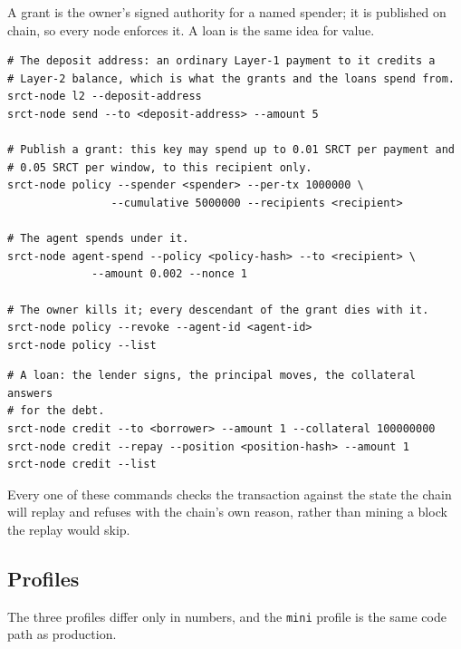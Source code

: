 \documentclass{article}
\begin{document}
A grant is the owner's signed authority for a named spender; it is published on
chain, so every node enforces it. A loan is the same idea for value.

\begin{verbatim}
# The deposit address: an ordinary Layer-1 payment to it credits a
# Layer-2 balance, which is what the grants and the loans spend from.
srct-node l2 --deposit-address
srct-node send --to <deposit-address> --amount 5

# Publish a grant: this key may spend up to 0.01 SRCT per payment and
# 0.05 SRCT per window, to this recipient only.
srct-node policy --spender <spender> --per-tx 1000000 \
                --cumulative 5000000 --recipients <recipient>

# The agent spends under it.
srct-node agent-spend --policy <policy-hash> --to <recipient> \
             --amount 0.002 --nonce 1

# The owner kills it; every descendant of the grant dies with it.
srct-node policy --revoke --agent-id <agent-id>
srct-node policy --list
\end{verbatim}

\begin{verbatim}
# A loan: the lender signs, the principal moves, the collateral answers
# for the debt.
srct-node credit --to <borrower> --amount 1 --collateral 100000000
srct-node credit --repay --position <position-hash> --amount 1
srct-node credit --list
\end{verbatim}

Every one of these commands checks the transaction against the state the chain
will replay and refuses with the chain's own reason, rather than mining a block
the replay would skip.

\subsection{Profiles}

The three profiles differ only in numbers, and the \texttt{mini} profile is
the same code path as production.
\end{document}
